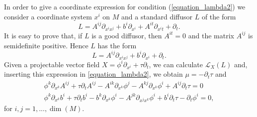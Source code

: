 \documentclass{article}[10pt]
\newcommand{\refeqn}[1]{(\ref{#1})}
\begin{document}
In order to give a coordinate expression for  condition  \refeqn{equation_lambda2} we consider  a coordinate system $x^i$  on $M$ and  a standard  diffusor $L$  of the form
$$L=A^{ij}\partial_{x^ix^j}+b^i\partial_{x^i}+A^{it}\partial_{x^it}+\partial_t.$$
It is easy to prove that, if $L$ is a good diffusor, then  $A^{it}=0$ and  the matrix $A^{ij}$ is semidefinite positive. Hence
 $L$ has the form
\begin{equation}\label{equation_symmetry1}
L=A^{ij}\partial_{x^ix^j}+b^i\partial_{x^i}+\partial_t.
\end{equation}
Given a projectable vector field  $X=\phi^i\partial_{x^i}+\tau \partial_t$, we can calculate $\mathcal{L}_X(L)$ and, inserting this expression in \eqref{equation_lambda2},  we obtain $\mu=-\partial_t\tau$ and
\begin{eqnarray}
&\phi^k\partial_{x^k}A^{ij}+\tau\partial_tA^{ij}-A^{ik}\partial_{x^k}\phi^j-A^{kj}\partial_{x^k}\phi^i+A^{ij}\partial_t\tau=0&\label{equation_symmetry2}\\
&\phi^k\partial_{x^k}b^i+\tau \partial_tb^i-b^k\partial_{x^k}\phi^i-A^{jk}\partial_{x^jx^k}\phi^i+b^i\partial_t\tau-\partial_t\phi^i=0,&\label{equation_symmetry3}
\end{eqnarray}
for $i,j=1,...,\dim(M)$.

\bigskip
\end{document}
